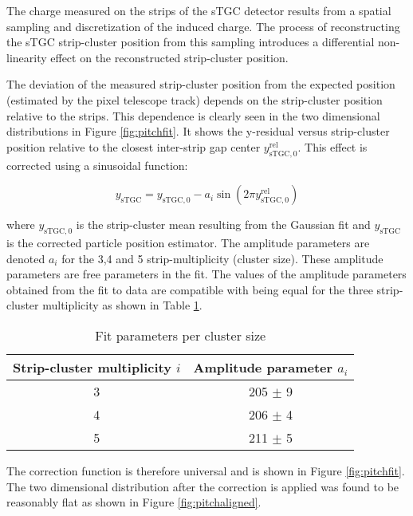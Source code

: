 The charge measured on the strips of the sTGC detector results from a spatial sampling and discretization of the induced
charge. The process of reconstructing the sTGC strip-cluster position from this sampling introduces a differential
non-linearity effect on the reconstructed strip-cluster position. \par

The deviation of the measured strip-cluster position from the expected position (estimated by the pixel telescope track)
depends on the strip-cluster position relative to the strips.  This dependence is clearly seen in the two dimensional
distributions in Figure \ref{fig:pitchfit}. It shows the y-residual versus strip-cluster position relative to the
closest inter-strip gap center $y_{\mathrm{sTGC},0}^{\mathrm{rel}}$. This effect is corrected using a sinusoidal
function:

	\begin{equation}\label{sin}
	 y_{\mathrm{sTGC}} = y_{\mathrm{sTGC},0}-a_i\sin \left(2\pi y_{\mathrm{sTGC},0}^{\mathrm{rel}}\right)
	\end{equation}
	
where $y_{\mathrm{sTGC},0}$ is the strip-cluster mean resulting from the Gaussian fit and $y_{\mathrm{sTGC}}$ is the
corrected particle position estimator. The amplitude parameters are denoted $a_i$ for the 3,4 and 5 strip-multiplicity
(cluster size). These amplitude parameters are free parameters in the fit. The values of the amplitude parameters
obtained from the fit to data are compatible with being equal for the three strip-cluster multiplicity as shown in Table
\ref{table}.\par

	\begin{table}
		\centering
		\caption{Fit parameters per cluster size}\label{table}
		\begin{tabular}{cc}
		\hline
		Strip-cluster multiplicity $i$ & Amplitude parameter $a_i$\\
		\hline
		3 & 205 $\pm$ 9\\
		4 & 206 $\pm$ 4\\
		5 & 211 $\pm$ 5\\
		\hline
		\end{tabular}
	\end{table}

The correction function is therefore universal and is shown in Figure \ref{fig:pitchfit}. The two dimensional
distribution after the correction is applied was found to be reasonably flat as shown in Figure
\ref{fig:pitchaligned}.\par

